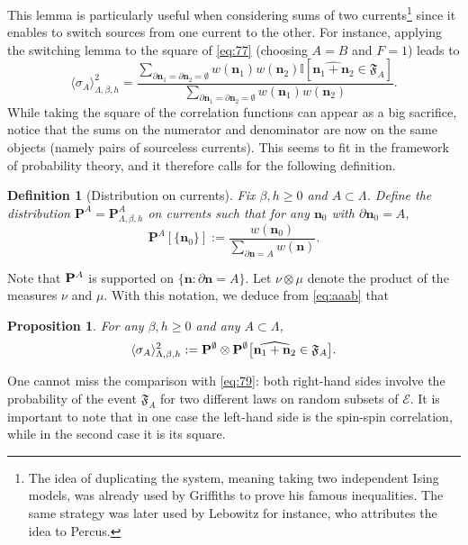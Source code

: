 \documentclass[a4paper,oneside,11pt]{article}
\newtheorem{proposition}[theorem]{Proposition}
\newtheorem{definition}[theorem]{Definition}
\newcommand{\ee}{\end{equation}}
\newcommand{\be}{\begin{equation}}
\begin{document}
This lemma is particularly useful when considering sums of two currents\footnote{The idea of duplicating the system, meaning taking two independent Ising models, was already used by Griffiths \cite{Gri67} to prove his famous inequalities. The same strategy was later used by Lebowitz \cite{Leb74} for instance, who attributes the idea to Percus.}  since it enables to switch sources from one current to the other. For instance, applying the switching lemma to the square of \eqref{eq:77} (choosing $A=B$ and $F=1$) leads to
\be\label{eq:aaab}
\langle \sigma_A\rangle_{\Lambda,\beta,h}^2=\frac{\displaystyle\sum_{\partial {\mathbf n}_1=\partial {\mathbf n}_2=\emptyset}w({\mathbf n}_1)w({\mathbf n}_2){\mathbb  I}[\widehat{{\mathbf n}_1+{\mathbf n} _2}\in\mathfrak F_A]}{\displaystyle\sum_{\partial {\mathbf n}_1=\partial {\mathbf n}_2=\emptyset}w({\mathbf n}_1)w({\mathbf n}_2)}.
\ee
While taking the square of the correlation functions can appear as a big sacrifice, notice that the sums on the numerator and denominator are now on the same objects (namely pairs of sourceless currents). This seems to fit in the framework of probability theory, and it therefore calls for the following definition.
 \begin{definition}[Distribution on currents]\label{def:probability}
Fix $\beta,h\ge0$ and $A\subset \Lambda$. Define the distribution $\mathbf P^A=\mathbf P_{\Lambda,\beta,h}^A$ on currents such that for any $\mathbf n_0$ with $\partial\mathbf n_0=A$,
\be\mathbf P^A[\{\mathbf n_0\}]:=\frac{w({\mathbf n_0})}{\sum_{\partial\mathbf n=A}w(\mathbf n)}.\ee
\end{definition}

Note that ${\bf P}^A$ is supported on $\{\mathbf n:\partial\mathbf n=A\}$. Let $\nu \otimes \mu$ denote the product of the measures $\nu$ and $\mu$. With this notation, we deduce from \eqref{eq:aaab} that 
\begin{proposition}
For any $\beta,h\ge0$ and any $A\subset\Lambda$,
\be\label{eq:spin to RC}
\langle \sigma_A\rangle_{\Lambda,\beta,h}^2:={\bf P}^\emptyset\otimes{\bf P}^\emptyset\big[\widehat{{\mathbf n}_1+{\mathbf n}_2}\in \mathfrak F_A\big].
\ee
\end{proposition}
One cannot miss the comparison with \eqref{eq:79}: both right-hand sides involve the probability of the event $\mathfrak F_A$ for two different laws on random subsets of $\mathcal E$. It is important to note that in one case the left-hand side is the spin-spin correlation, while in the second case it is its square.
\end{document}
